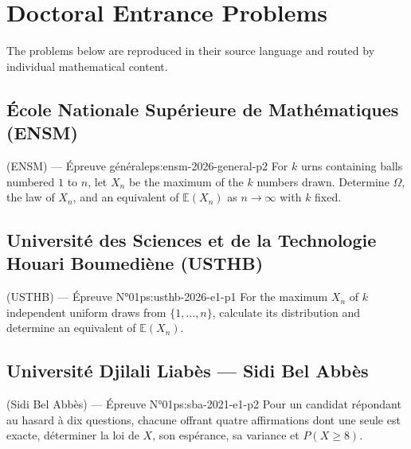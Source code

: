 \chapter{Doctoral Entrance Problems}
\label{ch:problems}

The problems below are reproduced in their source language and routed by individual mathematical content.
\newpage
\section{École Nationale Supérieure de Mathématiques (ENSM)}
\begin{problem}{(ENSM) — Épreuve générale}{ps:ensm-2026-general-p2}
For $k$ urns containing balls numbered $1$ to $n$, let $X_n$ be the maximum of the $k$ numbers drawn. Determine $\Omega$, the law of $X_n$, and an equivalent of $\mathbb E(X_n)$ as $n\to\infty$ with $k$ fixed.
\end{problem}
\newpage
\section{Université des Sciences et de la Technologie Houari Boumediène (USTHB)}
\begin{problem}{(USTHB) — Épreuve N°01}{ps:usthb-2026-e1-p1}
For the maximum $X_n$ of $k$ independent uniform draws from $\{1,\ldots,n\}$, calculate its distribution and determine an equivalent of $\mathbb E(X_n)$.
\end{problem}
\newpage
\section{Université Djilali Liabès --- Sidi Bel Abbès}
\begin{problem}{(Sidi Bel Abbès) — Épreuve N°01}{ps:sba-2021-e1-p2}
Pour un candidat répondant au hasard à dix questions, chacune offrant quatre affirmations dont une seule est exacte, déterminer la loi de $X$, son espérance, sa variance et $P(X\ge8)$.
\end{problem}
